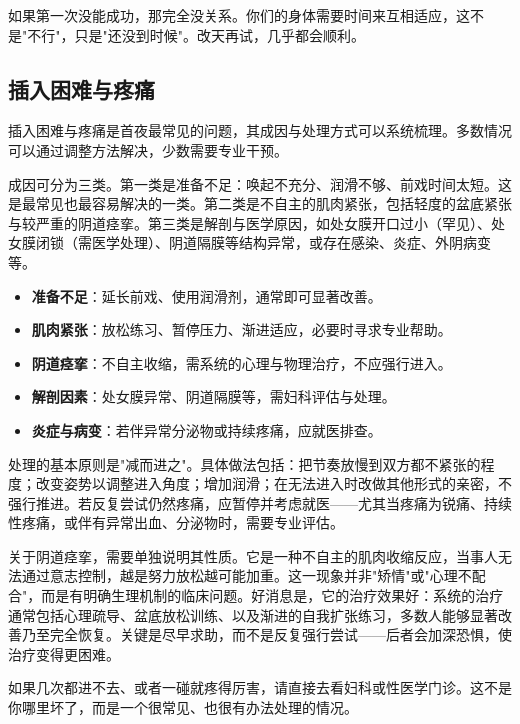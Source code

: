 \documentclass[12pt,UTF8]{ctexbook}
\newcommand{\keyword}[1]{\textbf{#1}}
\begin{document}
\begin{tcolorbox}[colback=pink!5!white,colframe=red!50!black,title=贴心小叮咛]
	如果第一次没能成功，那完全没关系。你们的身体需要时间来互相适应，这不是"不行"，只是"还没到时候"。改天再试，几乎都会顺利。
\end{tcolorbox}

\subsection{插入困难与疼痛}

插入困难与疼痛是首夜最常见的问题，其成因与处理方式可以系统梳理。多数情况可以通过调整方法解决，少数需要专业干预。

成因可分为三类。第一类是准备不足：唤起不充分、润滑不够、前戏时间太短。这是最常见也最容易解决的一类。第二类是不自主的肌肉紧张，包括轻度的盆底紧张与较严重的阴道痉挛。第三类是解剖与医学原因，如处女膜开口过小（罕见）、处女膜闭锁（需医学处理）、阴道隔膜等结构异常，或存在感染、炎症、外阴病变等。

\begin{itemize}
	\item \keyword{准备不足}：延长前戏、使用润滑剂，通常即可显著改善。
	\item \keyword{肌肉紧张}：放松练习、暂停压力、渐进适应，必要时寻求专业帮助。
	\item \keyword{阴道痉挛}：不自主收缩，需系统的心理与物理治疗，不应强行进入。
	\item \keyword{解剖因素}：处女膜异常、阴道隔膜等，需妇科评估与处理。
	\item \keyword{炎症与病变}：若伴异常分泌物或持续疼痛，应就医排查。
\end{itemize}

处理的基本原则是"减而进之"。具体做法包括：把节奏放慢到双方都不紧张的程度；改变姿势以调整进入角度；增加润滑；在无法进入时改做其他形式的亲密，不强行推进。若反复尝试仍然疼痛，应暂停并考虑就医——尤其当疼痛为锐痛、持续性疼痛，或伴有异常出血、分泌物时，需要专业评估。

关于阴道痉挛，需要单独说明其性质。它是一种不自主的肌肉收缩反应，当事人无法通过意志控制，越是努力放松越可能加重。这一现象并非"矫情"或"心理不配合"，而是有明确生理机制的临床问题。好消息是，它的治疗效果好：系统的治疗通常包括心理疏导、盆底放松训练、以及渐进的自我扩张练习，多数人能够显著改善乃至完全恢复。关键是尽早求助，而不是反复强行尝试——后者会加深恐惧，使治疗变得更困难。

\begin{tcolorbox}[colback=pink!5!white,colframe=red!50!black,title=贴心小叮咛]
	如果几次都进不去、或者一碰就疼得厉害，请直接去看妇科或性医学门诊。这不是你哪里坏了，而是一个很常见、也很有办法处理的情况。
\end{tcolorbox}
\end{document}

